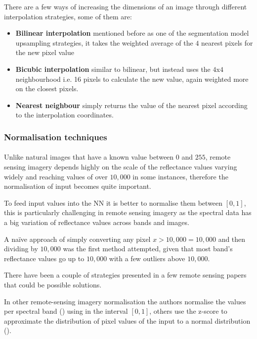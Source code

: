 There are a few ways of increasing the dimensions of an image through different interpolation strategies, some of them are:
    \begin{itemize}
        \item \textbf{Bilinear interpolation} mentioned before as one of the segmentation model upsampling strategies, it takes the weighted average of the $4$ nearest pixels for the new pixel value
        \item \textbf{Bicubic interpolation} similar to bilinear, but instead uses the $4$x$4$ neighbourhood \gls{i.e.} 16 pixels to calculate the new value, again weighted more on the closest pixels. 
        \item \textbf{Nearest neighbour} simply returns the value of the nearest pixel according to the interpolation coordinates.
    \end{itemize}
\subsubsection{Normalisation techniques} \label{img_norm}
\paragraph{}
Unlike natural images that have a known value between $0$ and $255$, remote sensing imagery depends highly on the scale of the reflectance values varying widely and reaching values of over $10,000$ in some instances, therefore the normalisation of input becomes quite important.

To feed input values into the \gls{NN} it is better to normalise them between $[0,1]$, this is particularly challenging in remote sensing imagery as the spectral data has a big variation of reflectance values across bands and images. 

A na\"ive approach of simply converting any pixel $x>10,000 =10,000$ and then dividing by $10,000$ was the first method attempted, given that most band's reflectance values go up to $10,000$ with a few outliers above $10,000$.

There have been a couple of strategies presented in a few remote sensing papers that could be possible solutions.

In other remote-sensing imagery normalisation the authors normalise the values per spectral band (\cite{8516352}) using in the interval $[0,1]$, others use the z-score to
approximate the distribution of pixel values of the input to a normal distribution (\cite{Zhong2017SatCNNSI}). 

